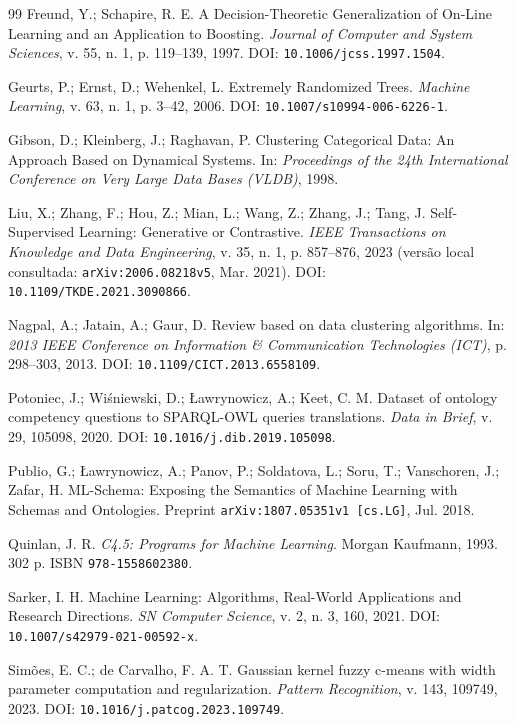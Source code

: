 \documentclass[11pt,a4paper]{article}
\begin{document}
\begin{thebibliography}{99}
Freund, Y.; Schapire, R. E. A Decision-Theoretic Generalization of On-Line Learning and an Application to Boosting. \emph{Journal of Computer and System Sciences}, v. 55, n. 1, p. 119--139, 1997. DOI: \texttt{10.1006/jcss.1997.1504}.

Geurts, P.; Ernst, D.; Wehenkel, L. Extremely Randomized Trees. \emph{Machine Learning}, v. 63, n. 1, p. 3--42, 2006. DOI: \texttt{10.1007/s10994-006-6226-1}.

Gibson, D.; Kleinberg, J.; Raghavan, P. Clustering Categorical Data: An Approach Based on Dynamical Systems. In: \emph{Proceedings of the 24th International Conference on Very Large Data Bases (VLDB)}, 1998.

Liu, X.; Zhang, F.; Hou, Z.; Mian, L.; Wang, Z.; Zhang, J.; Tang, J. Self-Supervised Learning: Generative or Contrastive. \emph{IEEE Transactions on Knowledge and Data Engineering}, v. 35, n. 1, p. 857--876, 2023 (versão local consultada: \texttt{arXiv:2006.08218v5}, Mar. 2021). DOI: \texttt{10.1109/TKDE.2021.3090866}.

Nagpal, A.; Jatain, A.; Gaur, D. Review based on data clustering algorithms. In: \emph{2013 IEEE Conference on Information \& Communication Technologies (ICT)}, p. 298--303, 2013. DOI: \texttt{10.1109/CICT.2013.6558109}.

Potoniec, J.; Wiśniewski, D.; Ławrynowicz, A.; Keet, C. M. Dataset of ontology competency questions to SPARQL-OWL queries translations. \emph{Data in Brief}, v. 29, 105098, 2020. DOI: \texttt{10.1016/j.dib.2019.105098}.

Publio, G.; Ławrynowicz, A.; Panov, P.; Soldatova, L.; Soru, T.; Vanschoren, J.; Zafar, H. ML-Schema: Exposing the Semantics of Machine Learning with Schemas and Ontologies. Preprint \texttt{arXiv:1807.05351v1 [cs.LG]}, Jul. 2018.

Quinlan, J. R. \emph{C4.5: Programs for Machine Learning}. Morgan Kaufmann, 1993. 302 p. ISBN \texttt{978-1558602380}.

Sarker, I. H. Machine Learning: Algorithms, Real-World Applications and Research Directions. \emph{SN Computer Science}, v. 2, n. 3, 160, 2021. DOI: \texttt{10.1007/s42979-021-00592-x}.

Simões, E. C.; de Carvalho, F. A. T. Gaussian kernel fuzzy c-means with width parameter computation and regularization. \emph{Pattern Recognition}, v. 143, 109749, 2023. DOI: \texttt{10.1016/j.patcog.2023.109749}.


\end{thebibliography}
\end{document}

